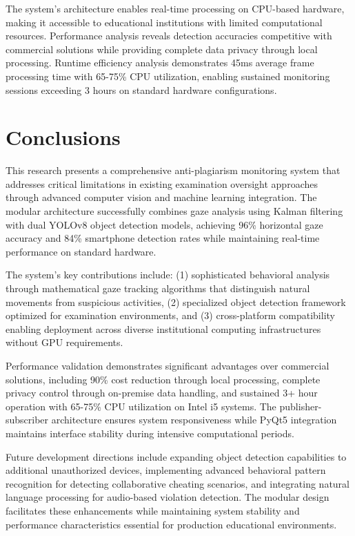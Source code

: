 \documentclass[conference]{IEEEtran}
\begin{document}
The system's architecture enables real-time processing on CPU-based hardware, 
making it accessible to educational institutions with limited computational resources. 
Performance analysis reveals detection accuracies competitive with commercial solutions 
while providing complete data privacy through local processing. Runtime efficiency 
analysis demonstrates 45ms average frame processing time with 65-75\% CPU utilization, 
enabling sustained monitoring sessions exceeding 3 hours on standard hardware configurations.

\section{Conclusions}

This research presents a comprehensive anti-plagiarism monitoring system that addresses critical limitations in existing examination oversight approaches through advanced computer vision and machine learning integration. The modular architecture successfully combines gaze analysis using Kalman filtering with dual YOLOv8 object detection models, achieving 96\% horizontal gaze accuracy and 84\% smartphone detection rates while maintaining real-time performance on standard hardware.

The system's key contributions include: (1) sophisticated behavioral analysis through mathematical gaze tracking algorithms that distinguish natural movements from suspicious activities, (2) specialized object detection framework optimized for examination environments, and (3) cross-platform compatibility enabling deployment across diverse institutional computing infrastructures without GPU requirements.

Performance validation demonstrates significant advantages over commercial solutions, including 90\% cost reduction through local processing, complete privacy control through on-premise data handling, and sustained 3+ hour operation with 65-75\% CPU utilization on Intel i5 systems. The publisher-subscriber architecture ensures system responsiveness while PyQt5 integration maintains interface stability during intensive computational periods.

Future development directions include expanding object detection capabilities to additional unauthorized devices, implementing advanced behavioral pattern recognition for detecting collaborative cheating scenarios, and integrating natural language processing for audio-based violation detection. The modular design facilitates these enhancements while maintaining system stability and performance characteristics essential for production educational environments.
\end{document}
